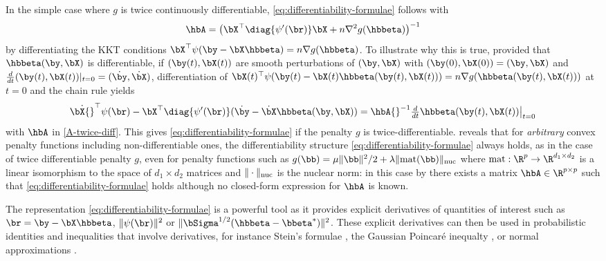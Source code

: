 \documentclass{colt2022} %
\numberwithin{equation}{section}
\begin{document}
    In the simple case where $g$ is twice continuously differentiable,
    \eqref{eq:differentiability-formulae} follows 
    \citep{bellec_zhang2019second_poincare}
    with 
    \begin{equation}
    \hbA=
    \bigl(\bX^\top\diag\{\psi'(\br)\}\bX + n \nabla^2 g(\hbbeta)\bigr)^{-1}
    \label{A-twice-diff}
    \end{equation}
    by differentiating the KKT conditions
    $\bX^\top\psi(\by-\bX\hbbeta) = n \nabla g(\hbbeta)$.
    To illustrate why this is true, provided that $\hbbeta(\by,\bX)$ is differentiable,
    if $(\by(t),\bX(t))$ are smooth perturbations of $(\by,\bX)$
    with $(\by(0),\bX(0))=(\by,\bX)$ and $\frac{d}{dt}(\by(t),\bX(t))|_{t=0}
    =(\dot\by,\dot\bX)$, differentiation of
    $\bX(t){}^\top\psi(\by(t)-\bX(t)\hbbeta(\by(t),\bX(t))) = n \nabla g(\hbbeta(\by(t),\bX(t)))$ at $t=0$ and the chain rule yields
    $$\dot\bX{}^\top \psi(\br) - \bX^\top\diag\{ \psi'(\br) \}
    (\dot\by - \dot\bX\hbbeta(\by,\bX))
    =\hbA{}^{-1}
    \tfrac{d}{dt}\hbbeta(\by(t),\bX(t))\big|_{t=0}
    $$
    with $\hbA$ in \eqref{A-twice-diff}.
    This gives \eqref{eq:differentiability-formulae}
    if the penalty $g$ is twice-differentiable.
     reveals that for \emph{arbitrary}
    convex penalty functions including non-differentiable ones,
    the differentiability structure
    \eqref{eq:differentiability-formulae} always holds, as in 
    the case of twice differentiable penalty $g$,
    even for penalty functions such as
    $g(\bb) = \mu \|\bb\|^2/2 + \lambda\|\text{mat}(\bb)\|_{\rm nuc}$
    where $\text{mat}:\R^p\to\R^{d_1\times d_2}$ is a linear
    isomorphism to the space of $d_1\times d_2$ matrices
    and $\|\cdot\|_{\rm nuc}$ is the nuclear norm:
    in this case by 
    there exists a matrix $\hbA\in\R^{p\times p}$ such that
    \eqref{eq:differentiability-formulae} holds 
    although no closed-form expression for $\hbA$ is known.

    The representation \eqref{eq:differentiability-formulae}
    is a powerful tool as it provides explicit derivatives
    of quantities of interest such as
    $\br=\by-\bX\hbbeta$, $\|\psi(\br)\|^2$ or
    $\|\bSigma^{1/2}(\hbbeta-\bbeta^*)\|^2$.
    These explicit derivatives
    can then be used in probabilistic identities and inequalities
    that involve derivatives, for instance Stein's formulae
    \citep{stein1981estimation}, the
    Gaussian Poincar\'e inequalty \cite[Theorem 3.20]{boucheron2013concentration},
    or normal approximations \citep{chatterjee2009fluctuations,bellec_zhang2019second_poincare}.
\end{document}
